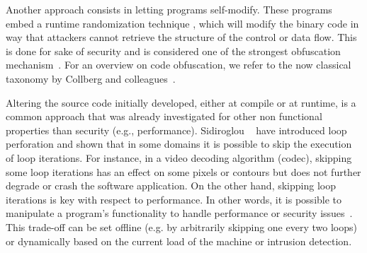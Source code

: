 
Another approach consists in letting programs self-modify. These programs embed a runtime randomization technique \cite{mavrogiannopoulos2011taxonomy}, which will modify the binary code in way that attackers cannot retrieve the structure of the control or data flow. This is done for sake of security and is considered one of the strongest obfuscation mechanism~\cite{mavrogiannopoulos2011taxonomy}. 
%
 For an overview on code obfuscation, we refer to the now classical taxonomy by Collberg and colleagues~\cite{collberg1997taxonomy}.  

% 

Altering the source code initially developed, either at compile or at runtime, is a common approach that was already investigated for other non functional properties than security (e.g., performance).
 Sidiroglou \etal~\cite{Sidiroglou-Douskos2011} have introduced loop perforation and shown that in some domains it is possible to skip the execution of loop iterations. 
For instance, in a video decoding algorithm (codec), skipping some loop iterations has an effect on some pixels or contours but does not further degrade or crash the software application. On the other hand, skipping loop iterations is key with respect to performance. 
In other words, it is possible to manipulate a program's functionality to handle performance or  security issues~\cite{Rinard11}. This trade-off can be set offline (e.g. by arbitrarily skipping one every two loops) or dynamically based on the current load of the machine or intrusion detection.


